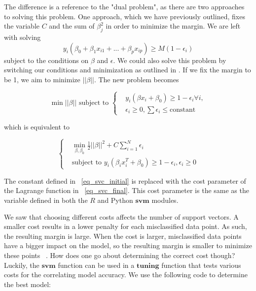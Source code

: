 \documentclass[12pt]{article}
\begin{document}
The difference is a reference to the "dual problem", as there are two approaches to solving this problem. One approach, which we have previously outlined, fixes the variable \(C\) and the sum of \(\beta_j^2\) in order to minimize the margin. We are left with solving \[
    y_i(\beta_0+\beta_1x_{i1}+...+\beta_px_{ip}) \ge M(1-\epsilon_i)
    \]
subject to the conditions on \(\beta\) and \(\epsilon\). We could also solve this problem by switching our conditions and minimization as outlined in \cite{esl2}. If we fix the margin to be 1, we aim to minimize \(||\beta||\). The new problem becomes 

\begin{equation} 
    \min ||\beta|| \text{ subject to }
    \begin{cases}
        &y_i(\beta x_i + \beta_0) \ge 1 - \epsilon_i \forall i, \\ & \epsilon_i \ge 0, \sum \epsilon_i \le \text{constant} 
    \end{cases}
    \label{eq_svc_initial}
\end{equation}

which is equivalent to

\begin{equation}
    \begin{cases}
        & \min_{\beta,\beta_0} \frac{1}{2} ||\beta||^2 + C \sum_{i=1}^{N} \epsilon_i \\
        & \text{subject to } y_i(\beta_i x_i^T+\beta_0) \ge 1 - \epsilon_i, \epsilon_i \ge 0
    \end{cases}
    \label{eq_svc_final}
\end{equation}

The constant defined in ~\ref{eq_svc_initial} is replaced with the cost parameter of the Lagrange function in ~\ref{eq_svc_final}. This cost parameter is the same as the variable defined in both the $R$ and Python $\textbf{svm}$ modules.

We saw that choosing different costs affects the number of support vectors. A smaller cost results in a lower penalty for each misclassified data point. As such, the resulting margin is large. When the cost is larger, misclassified data points have a bigger impact on the model, so the resulting margin is smaller to minimize these points ~\cite{cost_parameter}. How does one go about determining the correct cost though? Luckily, the $\textbf{svm}$ function can be used in a $\textbf{tuning}$ function that tests various costs for the correlating model accuracy. We use the following code to determine the best model:
\end{document}
